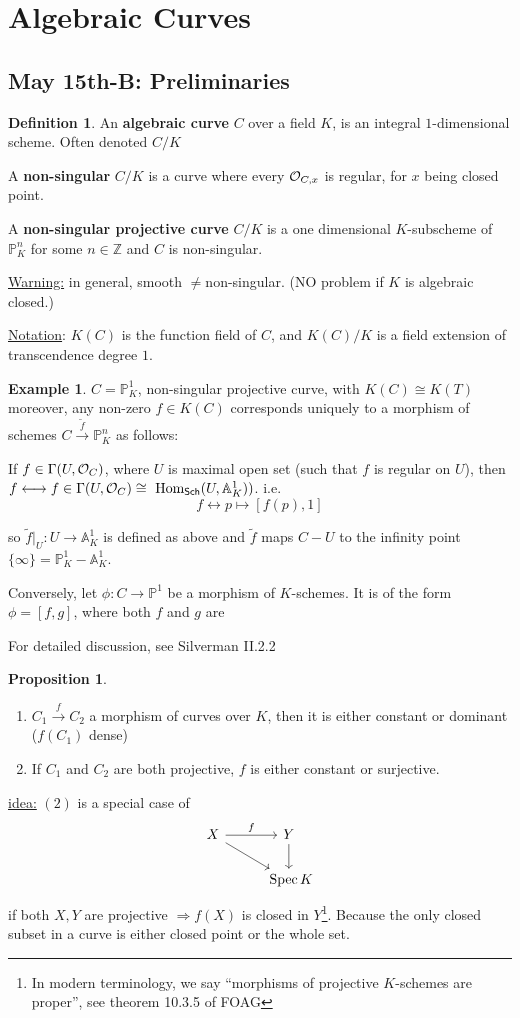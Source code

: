 \documentclass[11pt]{article}
\theoremstyle{definition}
\newtheorem{prop}[thm]{Proposition}
\newtheorem{dfn}[thm]{Definition}
\newtheorem{ex}[thm]{Example}
\renewcommand{\hom}{\text{ Hom}}
\newcommand{\spec}{\text{ Spec}\,}
\newcommand{\affn}{\mathbb A}
\newcommand{\proj}{\mathbb P}
\newcommand{\intg}{\mathbb Z}
\newcommand{\calo}{{\cal O}}
\newcommand{\Lrta}{\Longrightarrow}
\newcommand{\lrta}{\longrightarrow}
\newcommand{\llrta}{\longleftrightarrow}
\begin{document}
\section{Algebraic Curves}
\subsection{May 15th-B: Preliminaries}
\begin{dfn}
An \textbf{algebraic curve} $C$ over a field $K$, is an integral $1$-dimensional scheme. Often denoted $C/K$

A \textbf{non-singular} $C/K$ is a curve where every $\calo_{C,x}$ is regular, for $x$  being closed point.

A \textbf{non-singular projective curve} $C/K$ is  a one dimensional $K$-subscheme of $\proj^n_K$ for some $n\in \intg$ and $C$ is non-singular.
\end{dfn}
\underline{Warning:} in general, smooth $\neq $non-singular. (NO problem if $K$ is algebraic closed.)

\underline{Notation}: $K(C)$ is the function field of $C$, and  $K(C)/K$
 is a field extension of transcendence degree $1$. 

 \begin{ex}
 $C=\proj^1_K$, non-singular projective curve, with $K(C)\cong K(T)$ moreover, any non-zero $f\in K(C)$ corresponds uniquely to a morphism of schemes $C\overset{\tilde{f}}{\lrta}\proj^n_K$ as follows:
 
 If $f\in \Gamma(U,\calo_C)$, where $U$ is maximal open set (such that $f$ is regular on $U$), then  $f\llrta f\in \Gamma(U,\calo_C)\cong \hom_{\mathsf{Sch}}(U,\affn^1_K))$. i.e.
 $$
f\llrta p\mapsto [f(p),1]
 $$

 so $\tilde{f}|_U:U\lrta \affn^1_K$ is defined as above and $\tilde{f}$ maps $C-U$ to the infinity point $\{\infty\}=\proj^1_K-\affn^1_K$.

 Conversely, let $\phi: C\lrta \proj^1$ be a morphism of $K$-schemes. It is of the form
 $\phi=[f,g]$, where both $f$ and $g$ are  

 For detailed discussion, see Silverman II.2.2
 \end{ex}
 \begin{prop}\ 
\begin{enumerate}[label=(\arabic*)]
\item $C_1\overset{f}{\lrta}C_2$ a morphism of curves over $K$, then it is either constant or dominant ($f(C_1)$ dense)
\item If $C_1$ and $C_2$ are both projective, $f$ is either constant or surjective. 
\end{enumerate}
 \end{prop}
\underline{idea:} $(2)$ is a special case of 
$$
\begin{tikzcd}
X \arrow[rd] \arrow[r, "f"] & Y \arrow[d] \\
 & \spec K
\end{tikzcd}
$$
if both $X,Y$ are projective $\Lrta f(X)$ is closed in $Y$\footnote{In modern terminology, we say ``morphisms of projective $K$-schemes are proper'', see theorem 10.3.5 of FOAG}. Because the only closed subset in a curve is either closed point or the whole set.
\end{document}
